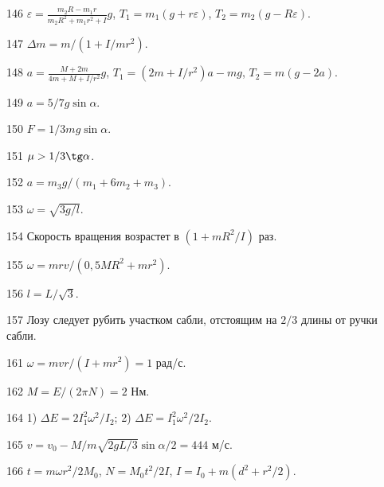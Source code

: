 \begin{Answer}{146}
$\varepsilon = \frac{m_2R - m_1r}{m_2R^2 + m_1r^2 + I}g$, $T_1 = m_1(g+r\varepsilon)$, $T_2 = m_2(g-R\varepsilon)$.
\end{Answer}
\begin{Answer}{147}
$\Delta m = m/(1+I/mr^2)$.
\end{Answer}
\begin{Answer}{148}
$a = \frac{M+2m}{4m+M+I/r^2}g$, $T_1 = (2m+I/r^2)a - mg$, $T_2=m(g-2a)$.
\end{Answer}
\begin{Answer}{149}
$a=5/7g\sin \alpha$.
\end{Answer}
\begin{Answer}{150}
$F = 1/3 mg \sin \alpha$.
\end{Answer}
\begin{Answer}{151}
$\mu > 1/3 \tg \alpha$.
\end{Answer}
\begin{Answer}{152}
$a = m_3g/(m_1 + 6m_2 +m_3)$.
\end{Answer}
\begin{Answer}{153}
$\omega = \sqrt{3g/l}$.
\end{Answer}
\begin{Answer}{154}
Скорость вращения возрастет в $(1+mR^2/I)$ раз.
\end{Answer}
\begin{Answer}{155}
$\omega = mrv/(0,5MR^2 + mr^2)$.
\end{Answer}
\begin{Answer}{156}
$l = L/\sqrt{3}$.
\end{Answer}
\begin{Answer}{157}
Лозу следует рубить участком сабли, отстоящим на $2/3$ длины от ручки сабли.
\end{Answer}
\begin{Answer}{161}
$\omega = mvr/(I+mr^2) = 1$ рад/с.
\end{Answer}
\begin{Answer}{162}
$M = E / (2 \pi N) = 2$ Нм.
\end{Answer}
\begin{Answer}{164}
1) $\Delta E = 2I_1^2\omega^2/I_2$; 2) $\Delta E = I_1^2\omega^2/2I_2$.
\end{Answer}
\begin{Answer}{165}
$v = v_0 -M/m \sqrt{2gL/3} \sin \alpha /2 = 444$ м/с.
\end{Answer}
\begin{Answer}{166}
$t = m\omega r^2 / 2M_0$, $N = M_0t^2/2I$, $I = I_0 + m(d^2 + r^2/2)$.
\end{Answer}
